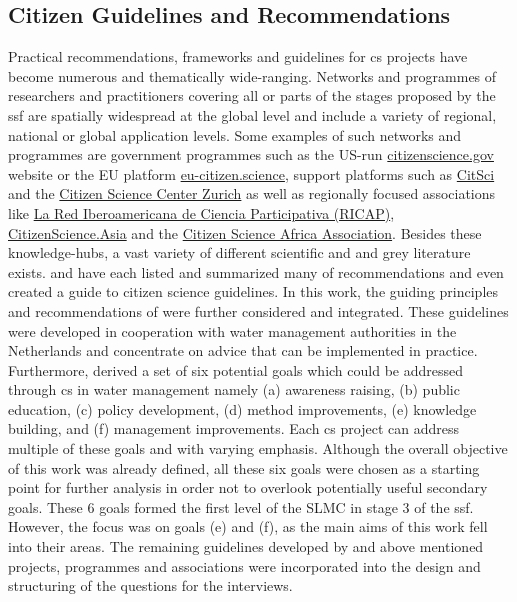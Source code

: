 \subsection{Citizen Guidelines and Recommendations}

Practical recommendations, frameworks and guidelines for \acrlong*{cs} projects have become numerous and thematically wide-ranging. Networks and programmes of researchers and practitioners covering all or parts of the stages proposed by the \acrshort*{ssf} are spatially widespread at the global level and include a variety of regional, national or global application levels. Some examples of such networks and programmes are government programmes such as the US-run \href{https://www.citizenscience.gov/}{citizenscience.gov} website or the EU platform \href{https://eu-citizen.science/}{eu-citizen.science}, support platforms such as \href{https://citsci.org/}{CitSci} and the \href{https://citizenscience.ch/en/}{Citizen Science Center Zurich} as well as regionally focused associations like \href{http://cienciaparticipativa.net/la-ricap/}{La Red Iberoamericana de Ciencia Participativa (RICAP)}, \href{https://citizenscience.asia/}{CitizenScience.Asia} and the \href{https://www.usiu.ac.ke/citsci-africa-association/}{Citizen Science Africa Association}.\newline
Besides these knowledge-hubs, a vast variety of different scientific and and grey literature exists. \autocite{fraislCitizenScienceEnvironmental2022} and \autocite{westonCommunityBasedWaterMonitoring2015} have each listed and summarized many of recommendations and \autocite{garciaFindingWhatYou2021} even created a guide to citizen science guidelines. In this work, the guiding principles and recommendations of \autocite{minkmanCitizenScienceWater2015} were further considered and integrated. These guidelines were developed in cooperation with water management authorities in the Netherlands and concentrate on advice that can be implemented in practice. Furthermore, \autocite{minkmanCitizenScienceWater2015} derived a set of six potential goals which could be addressed through \acrlong*{cs} in water management namely (a) awareness raising, (b) public education, (c) policy development, (d) method improvements, (e) knowledge building, and (f) management improvements. Each \acrshort*{cs} project can address multiple of these goals and with varying emphasis. Although the overall objective of this work was already defined, all these six goals were chosen as a starting point for further analysis in order not to overlook potentially useful secondary goals. These 6 goals formed the first level of the SLMC in stage 3 of the \acrshort*{ssf}. However, the focus was on goals (e) and (f), as the main aims of this work fell into their areas. The remaining guidelines developed by \autocite{minkmanCitizenScienceWater2015} and above mentioned projects, programmes and associations were incorporated into the design and structuring of the questions for the interviews.
